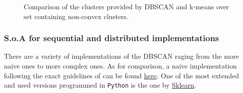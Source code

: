 \documentclass[10pt,journal,compsoc]{IEEEtran}
\let\MYoriglatexcaption\caption
\renewcommand{\caption}[2][\relax]{\MYoriglatexcaption[#2]{#2}}
\begin{document}
\begin{figure}[!t]
\centering
{}
\hfil
{}
\caption{Comparison of the clusters provided by DBSCAN and k-means over set containing non-convex clusters.}
\label{fig_comp_clust}
\end{figure}

\subsubsection{S.o.A for sequential and distributed implementations}


There are a variety of implementations of the DBSCAN raging from the more naive ones to more complex ones. As for comparison, a naive implementation following the exact guidelines of \cite{ReferencePaper} can be found \href{https://github.com/csegarragonz/DBSCAN-pyCOMPSs/blob/master/ext_versions/DBSCAN_Seq.py}{here}. One of the most extended and used versions programmed in \texttt{Python} is the one by \href{http://scikit-learn.org/stable/modules/generated/sklearn.cluster.DBSCAN.html}{Sklearn}.
\end{document}
